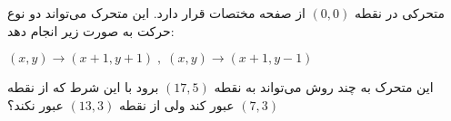 \p
متحرکی در نقطه
$(0, 0)$ 
 از صفحه مختصات قرار دارد. این متحرک می‌تواند دو نوع حرکت به صورت زیر انجام دهد:
	\p
    \centerline{$(x,y) \to (x+1, y+1) \;,\; (x,y) \to (x+1, y-1)$}
	\p
    این  متحرک به چند روش می‌تواند به نقطه 
$(17, 5)$ 
    برود با این شرط که از نقطه
$(7, 3)$ 
    عبور کند ولی از نقطه
$(13, 3)$ 
     عبور نکند؟